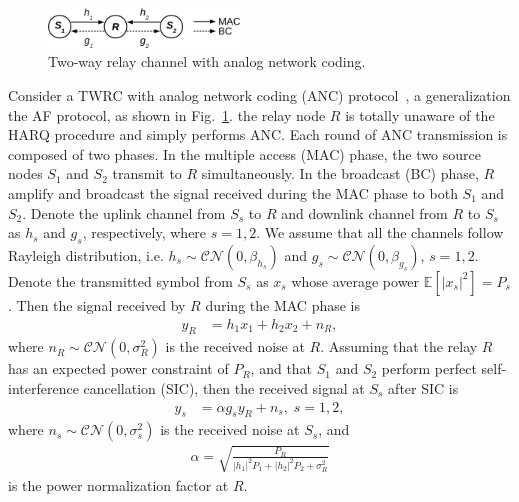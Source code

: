 \documentclass{article}
\begin{document}
\begin{figure}[!t]
  \centering
  \includegraphics[width=2.0in]{./figs/model.eps}
  \caption{Two-way relay channel with analog network coding.}
  \label{fig:model}
\end{figure}

Consider a TWRC with analog network coding (ANC) protocol~\cite{choi2013energy}, 
a generalization the AF protocol, as shown in Fig.~\ref{fig:model}. the relay
node $R$ is totally unaware of the HARQ procedure and simply performs ANC. Each round of ANC
transmission is composed of two phases. In the multiple access (MAC) phase, the
two source nodes $S_1$ and $S_2$ transmit to $R$ simultaneously. In the
broadcast (BC) phase, $R$ amplify and broadcast the signal received during the
MAC phase to both $S_1$ and $S_2$.
Denote the uplink channel from $S_s$ to $R$ and downlink channel from $R$ to
$S_s$ as $h_s$ and $g_s$, respectively, where $s=1,2$. We assume that all
the channels follow Rayleigh distribution, i.e.
$h_s\sim\mathcal{CN}(0,\beta_{h_s})$ and $g_s\sim\mathcal{CN}(0,\beta_{g_s})$,
$s=1,2$. Denote the transmitted symbol from $S_s$ as $x_s$ whose average power
$\mathbb{E}[|x_s|^2]=P_s$. Then the signal received by $R$ during the MAC phase
is
\begin{align}
  y_R & = h_1x_1+h_2x_2+n_R,
  \label{eq:y_R}
\end{align}
where $n_R\sim\mathcal{CN}(0,\sigma_R^2)$ is the received noise at $R$. Assuming
that the relay $R$ has an expected power constraint of $P_R$, and that
$S_1$ and $S_2$ perform perfect self-interference cancellation (SIC), then the
received signal at $S_s$ after SIC is
\begin{align}
  y_s &= \alpha g_s y_R + n_s,\;s=1,2,
  \label{eq:y_s}
\end{align}
where $n_s\sim\mathcal{CN}(0,\sigma_s^2)$ is the received noise at $S_s$, and
\begin{align}
  \alpha = \sqrt{\frac{P_R}{|h_1|^2P_1 + |h_2|^2P_2+\sigma_R^2}}
\end{align}
is the power normalization factor at $R$.
\end{document}
